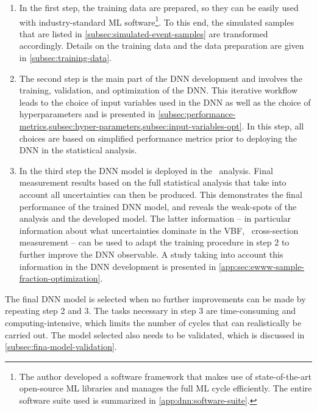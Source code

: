 \begin{enumerate}
    \item In the first step, the training data are prepared, so they can be easily used with industry-standard ML software\footnote{The author developed a software framework that makes use of state-of-the-art open-source ML libraries and manages the full ML cycle efficiently.
    The entire software suite used is summarized in \cref{app:dnn:software-suite}.}. To this end, the simulated samples that are listed in \cref{subsec:simulated-event-samples} are transformed accordingly. Details on the training data and the data preparation are given in \cref{subsec:training-data}.
    \item The second step is the main part of the DNN development and involves the training, validation, and optimization of the DNN.
          This iterative workflow leads to the choice of input variables used in the DNN as well as the choice of hyperparameters and is presented in \cref{subsec:performance-metrics,subsec:hyper-parameters,subsec:input-variables-opt}.
          In this step, all choices are based on simplified performance metrics prior to deploying the DNN in the statistical analysis.
    \item In the third step the DNN model is deployed in the \HWW\ analysis. Final measurement results based on the full statistical analysis that take into account all uncertainties can then be produced. This demonstrates the final performance of the trained DNN model, and reveals the weak-spots of the analysis and the developed model. The latter information -- in particular information about what uncertainties dominate in the VBF, \HWW\ cross-section measurement -- can be used to adapt the training procedure in step 2 to further improve the DNN observable. A study taking into account this information in the DNN development is presented in \cref{app:sec:ewww-sample-fraction-optimization}.
\end{enumerate}
The final DNN model is selected when no further improvements can be made by repeating step 2 and 3. The tasks necessary in step 3 are time-consuming and computing-intensive, which limits the number of cycles that can realistically be carried out. 
The model selected also needs to be validated, which is discussed in \cref{subsec:fina-model-validation}.

